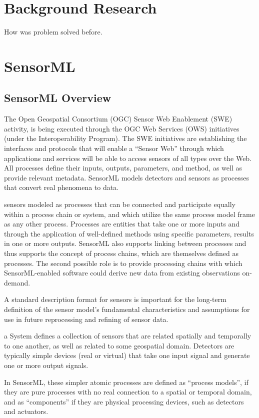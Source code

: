 \documentclass[]{final_report}
\begin{document}
\chapter{ Background Research}

How was problem solved before.


\chapter{SensorML}
\section{SensorML Overview}
The Open Geospatial Consortium (OGC) Sensor Web Enablement (SWE) activity, is being executed through the OGC Web Services (OWS) initiatives (under the Interoperability Program). The SWE initiatives are establishing the interfaces and protocols that will enable a “Sensor Web” through which applications and services will be able to access sensors of all types over the Web.
All processes define their inputs, outputs, parameters, and method, as well as provide relevant metadata. SensorML models detectors and sensors as processes that convert real phenomena to data.

sensors modeled as processes that can be connected and participate equally within a process chain or system, and which utilize the same process model frame as any other process.
Processes are entities that take one or more inputs and through the application of well-defined methods using specific parameters, results in one or more outputs.  SensorML also supports linking between processes and thus supports the concept of process chains, which are themselves defined as processes.
The second possible role is to provide processing chains with which SensorML-enabled software could derive new data from existing observations on-demand.

A standard description format for sensors is important for the long-term definition of the sensor model’s fundamental characteristics and assumptions for use in future reprocessing and refining of sensor data.

a System defines a collection of sensors that are related spatially and temporally to one another, as well as related to some geospatial domain.
Detectors are typically simple devices (real or virtual) that take one input signal and generate one or more output signals.

In SensorML, these simpler atomic processes are defined as “process models”, if they are pure processes with no real connection to a spatial or temporal domain, and as “components” if they are physical processing devices, such as detectors and actuators.
\end{document}
